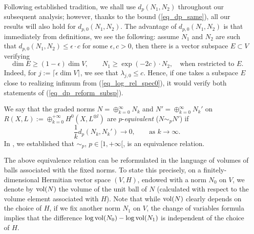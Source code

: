 \documentclass[12pt]{article}
\numberwithin{equation}{section}
\theoremstyle{theorem}
\theoremstyle{definition}
\theoremstyle{remark}
\begin{document}
	\par 
	Following established tradition, we shall use $d_p(N_1, N_2)$ throughout our subsequent analysis; however, thanks to the bound (\ref{eq_dp_same}), all our results will also hold for $d_{p, 0}(N_1, N_2)$.
	The advantage of $d_{p, 0}(N_1, N_2)$ is that immediately from definitions, we see the following: assume $N_1$ and $N_2$ are such that $d_{p, 0}(N_1, N_2) \leq \epsilon \cdot c$ for some $\epsilon, c > 0$, then there is a vector subspace $E \subset V$ verifying 
	\begin{equation}\label{eq_dp_reform_subsp}
		\dim E \geq (1 - \epsilon) \dim V, \qquad N_1 \geq \exp(-2 c) \cdot N_2, \quad \text{when restricted to } E.
	\end{equation}
	Indeed, for $j := \lceil \epsilon \dim V \rceil$, we see that $\lambda_{j, 0} \leq c$.
	Hence, if one takes a subspace $E$ close to realizing infimum from (\ref{eq_log_rel_spec0}), it would verify both statements of (\ref{eq_dp_reform_subsp}).
	\par 
	\begin{sloppypar}
	We say that the graded norms $N = \oplus_{k = 0}^{\infty} N_k$ and $N' = \oplus_{k = 0}^{\infty} N_k'$ on $R(X, L) := \oplus_{k = 0}^{+ \infty} H^0(X, L^{\otimes l})$ are $p$-\textit{equivalent} ($N \sim_p N'$) if 
 	\begin{equation}\label{defn_equiv_relp}
		\frac{1}{k} d_p(N_k, N_k') \to 0, \qquad \text{as } k \to \infty.
	\end{equation}
	In \cite[\S 2.3]{FinNarSim}, we established that $\sim_p$, $p \in [1, +\infty[$, is an equivalence relation.
	\end{sloppypar}
	\par 
	The above equivalence relation can be reformulated in the language of volumes of balls associated with the fixed norms.
	To state this precisely, on a finitely-dimensional Hermitian vector space $(V, H)$, endowed with a norm $N_0$ on $V$, we denote by ${\rm{vol}} (N)$ the volume of the unit ball of $N$ (calculated with respect to the volume element associated with $H$).
	Note that while ${\rm{vol}} (N)$ clearly depends on the choice of $H$, if we fix another norm $N_1$ on $V$, the change of variables formula implies that the difference $\log {\rm{vol}} (N_0) - \log {\rm{vol}} (N_1)$ is independent of the choice of $H$.
\end{document}
